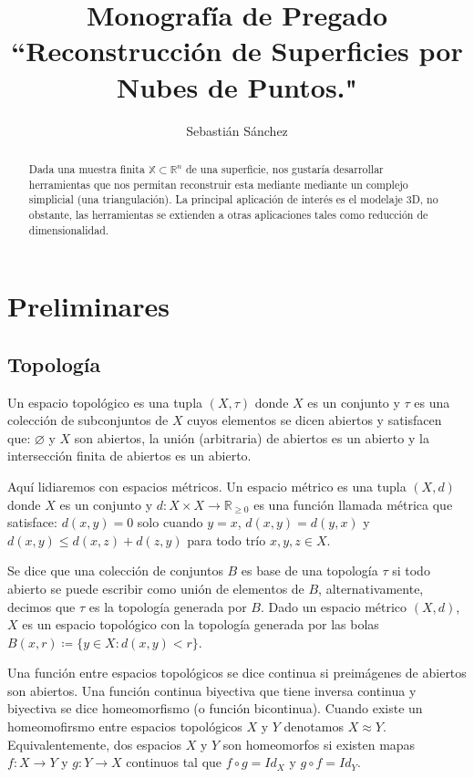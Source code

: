\documentclass[legalpaper,12pt]{article}
\title{
Monografía de Pregado\\
``Reconstrucción de Superficies por Nubes de Puntos."\\
}
\author{\normalsize Sebastián Sánchez}
\date{}
\newcommand{\X}{\mathbb{X}}
\newcommand{\R}{\mathbb{R}}
\begin{document}
\maketitle

\begin{abstract}
Dada una muestra finita \(\X \subset \R^n\) de una superficie, nos gustaría
desarrollar herramientas que nos permitan reconstruir esta mediante mediante
un complejo simplicial (una triangulación). La principal aplicación de interés 
es el modelaje 3D, no obstante, las herramientas se extienden a otras aplicaciones
tales como reducción de dimensionalidad.
\end{abstract}

\tableofcontents

\newpage

\section{Preliminares}

\subsection{Topología}

Un espacio topológico es una tupla \((X,\tau)\) donde 
\(X\) es un conjunto y \(\tau\) es una colección de subconjuntos de \(X\)
cuyos elementos se dicen abiertos y satisfacen que: \(\varnothing\) y \(X\)
son abiertos, la unión (arbitraria) de abiertos es un abierto y la intersección
finita de abiertos es un abierto. 

Aquí lidiaremos con espacios métricos. Un espacio métrico
es una tupla \((X,d)\) donde \(X\) es un conjunto y \(d\colon X\times X \to \R_{\ge 0}\) es una
función llamada métrica que satisface: \(d(x,y) = 0\) solo cuando \(y = x\), \(d(x,y) = d(y,x)\) y \(d(x,y) \le
d(x,z) + d(z,y)\) para todo trío \(x,y,z\in X\).

Se dice que una colección de conjuntos \(B\) es base de una topología \(\tau\) si todo abierto 
se puede escribir como unión de elementos de \(B\), alternativamente, decimos que \(\tau\) es la 
topología generada por \(B\). Dado un espacio métrico \((X,d)\), \(X\) es un espacio
topológico con la topología generada por las bolas \(B(x,r) \coloneqq \lbrace y\in X\colon d(x,y) < r\rbrace\). 

Una función entre espacios topológicos se dice continua si preimágenes de abiertos son abiertos.
Una función continua biyectiva que tiene inversa continua y biyectiva se dice homeomorfismo (o función
bicontinua). 
Cuando existe un homeomofirsmo entre espacios topológicos \(X\) y \(Y\) denotamos \(X \approx Y\).
Equivalentemente, dos espacios \(X\) y \(Y\) son homeomorfos si existen mapas \(f\colon X \to Y\)
y \(g\colon Y \to X\) continuos tal que \(f\circ g = Id_X\) y \(g\circ f = Id_Y\).   
\end{document}
